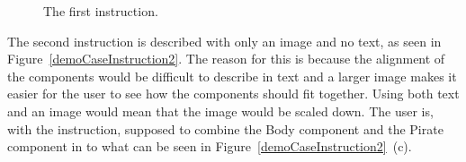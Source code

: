 	\begin{figure}[H]%
		\centering
		\qquad
		\qquad
		\caption{The first instruction.}
		\label{demoCaseInstruction1}
	\end{figure}

The second instruction is described with only an image and no text, as seen in Figure~\ref{demoCaseInstruction2}. The reason for this is because the alignment of the components would be difficult to describe in text and a larger image makes it easier for the user to see how the components should fit together. Using both text and an image would mean that the image would be scaled down. The user is, with the instruction, supposed to combine the Body component and the Pirate component in to what can be seen in Figure~\ref{demoCaseInstruction2}~(c).

